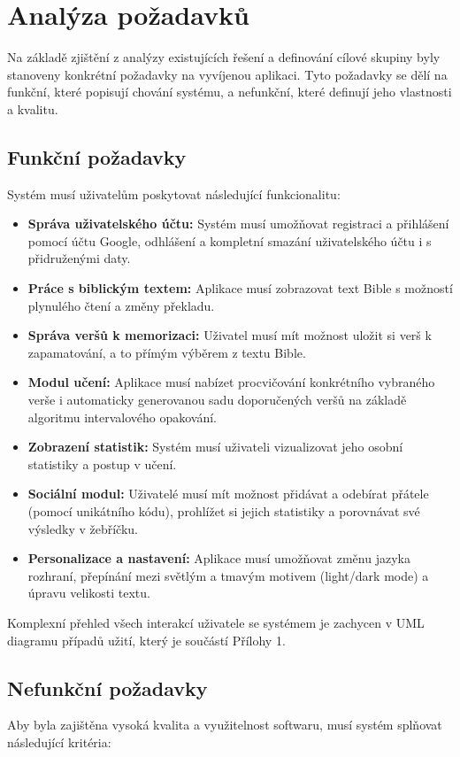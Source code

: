 \documentclass[12pt, a4paper, oneside]{article}
\begin{document}
	\newpage
	\section{Analýza požadavků}
	Na základě zjištění z analýzy existujících řešení a definování cílové skupiny byly stanoveny konkrétní požadavky na vyvíjenou aplikaci. Tyto požadavky se dělí na funkční, které popisují chování systému, a nefunkční, které definují jeho vlastnosti a kvalitu.
	
	\subsection{Funkční požadavky}
	Systém musí uživatelům poskytovat následující funkcionalitu:
	
	\begin{itemize}
		\item \textbf{Správa uživatelského účtu:} Systém musí umožňovat registraci a přihlášení pomocí účtu Google, odhlášení a kompletní smazání uživatelského účtu i s přidruženými daty.
		\item \textbf{Práce s biblickým textem:} Aplikace musí zobrazovat text Bible s možností plynulého čtení a změny překladu.
		\item \textbf{Správa veršů k memorizaci:} Uživatel musí mít možnost uložit si verš k zapamatování, a to přímým výběrem z textu Bible.
		\item \textbf{Modul učení:} Aplikace musí nabízet procvičování konkrétního vybraného verše i automaticky generovanou sadu doporučených veršů na základě algoritmu intervalového opakování.
		\item \textbf{Zobrazení statistik:} Systém musí uživateli vizualizovat jeho osobní statistiky a postup v učení.
		\item \textbf{Sociální modul:} Uživatelé musí mít možnost přidávat a odebírat přátele (pomocí unikátního kódu), prohlížet si jejich statistiky a porovnávat své výsledky v žebříčku.
		\item \textbf{Personalizace a nastavení:} Aplikace musí umožňovat změnu jazyka rozhraní, přepínání mezi světlým a tmavým motivem (light/dark mode) a úpravu velikosti textu.
	\end{itemize}
	
	Komplexní přehled všech interakcí uživatele se systémem je zachycen v UML diagramu případů užití, který je součástí Přílohy 1.
	
	\subsection{Nefunkční požadavky}
	Aby byla zajištěna vysoká kvalita a využitelnost softwaru, musí systém splňovat následující kritéria:
	
\end{document}
